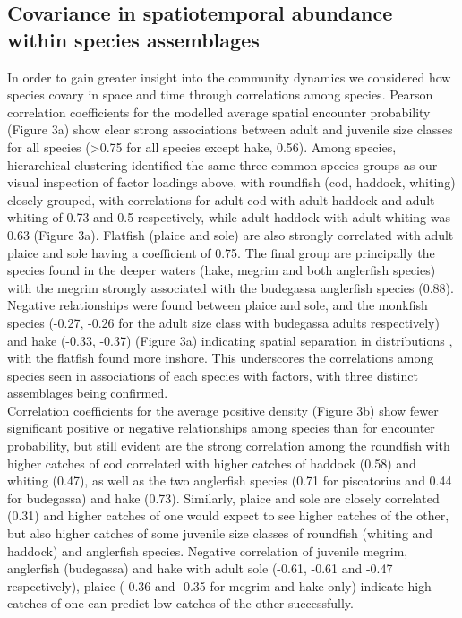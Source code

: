 \documentclass[fleqn,10pt]{wlscirep}
\begin{document}
\begin{linenumbers}
\subsection*{Covariance in spatiotemporal abundance within
		species assemblages\\} 
In order to gain greater insight into the community dynamics we considered how
species covary in space and time through correlations among species. Pearson
correlation coefficients for the modelled average spatial encounter probability
(Figure 3a) show clear strong associations between adult and juvenile size
classes for all species (\textgreater 0.75 for all species except hake, 0.56).
Among species, hierarchical clustering identified the same three common
species-groups as our visual inspection of factor loadings above, with
roundfish (cod, haddock, whiting) closely grouped, with correlations for adult
cod with adult haddock and adult whiting of 0.73 and 0.5 respectively, while
adult haddock with adult whiting was 0.63 (Figure 3a). Flatfish (plaice and
sole) are also strongly correlated with adult plaice and sole having a
coefficient of 0.75. The final group are principally the species found in the
deeper waters (hake, megrim and both anglerfish species) with the megrim
strongly associated with the budegassa anglerfish species (0.88). Negative
relationships were found between plaice and sole, and the monkfish species
(-0.27, -0.26 for the adult size class with budegassa adults respectively) and
hake (-0.33, -0.37) (Figure 3a) indicating spatial separation in distributions
, with the flatfish found more inshore. This underscores the correlations among
species seen in associations of each species with factors, with three distinct
assemblages being confirmed.\\

Correlation coefficients for the average positive density (Figure 3b) show
fewer significant positive or negative relationships among species than for
encounter probability, but still evident are the strong correlation among the
roundfish with higher catches of cod correlated with higher catches of haddock
(0.58) and whiting (0.47), as well as the two anglerfish species (0.71 for
piscatorius and 0.44 for budegassa) and hake (0.73). Similarly, plaice and sole
are closely correlated (0.31) and higher catches of one would expect to see
higher catches of the other, but also higher catches of some juvenile size
classes of roundfish (whiting and haddock) and anglerfish species. Negative
correlation of juvenile megrim, anglerfish (budegassa) and hake with adult sole
(-0.61, -0.61 and -0.47 respectively), plaice (-0.36 and -0.35 for megrim and
hake only) indicate high catches of one can predict low catches of the other
successfully.\\


\end{linenumbers}
\end{document}
